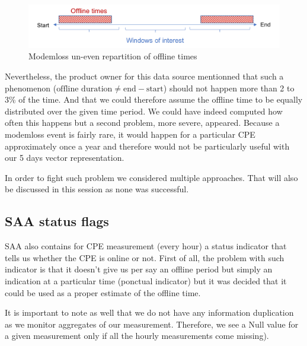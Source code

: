 \begin{figure}[ht]
    \begin{center}
    \includegraphics[width=0.7\linewidth]{images/modemloss.png}
    \end{center}
    \caption{Modemloss un-even repartition of offline times}
    \label{modemloss}
\end{figure}

Nevertheless, the product owner for this data source mentionned that such a phenomenon ($\text{offline duration} \neq \text{end} - \text{start}$) should not happen more than 2 to 3\% of the time. And that we could therefore assume the offline time to be equally distributed over the given time period. We could have indeed computed how often this happens but a second problem, more severe, appeared. Because a modemloss event is fairly rare, it would happen for a particular CPE approximately once a year and therefore would not be particularly useful with our 5 days vector representation.

In order to fight such problem we considered multiple approaches. That will also be discussed in this session as none was successful.

\subsection{SAA status flags}
SAA also contains for CPE measurement (every hour) a status indicator that tells us whether the CPE is online or not. First of all, the problem with such indicator is that it doesn't give us per say an offline period but simply an indication at a particular time (ponctual indicator) but it was decided that it could be used as a proper estimate of the offline time.

It is important to note as well that we do not have any information duplication as we monitor aggregates of our measurement. Therefore, we see a Null value for a given measurement only if all the hourly measurements come missing).
